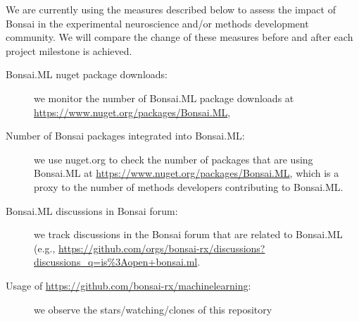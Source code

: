 We are currently using the measures described below to assess the impact of
Bonsai in the experimental neuroscience and/or methods development community.
We will compare the change of these measures before and after each project
milestone is achieved.

\begin{description}

    \item[Bonsai.ML nuget package downloads:] we monitor the number of
    Bonsai.ML package downloads at
    \url{https://www.nuget.org/packages/Bonsai.ML},

    \item[Number of Bonsai packages integrated into Bonsai.ML:] we use
    nuget.org to check the number of packages that are using Bonsai.ML at
    \url{https://www.nuget.org/packages/Bonsai.ML}, which is a proxy to the
    number of methods developers contributing to Bonsai.ML.

    \item[Bonsai.ML discussions in Bonsai forum:] we track discussions in the
    Bonsai forum that are related to Bonsai.ML (e.g.,
    \url{https://github.com/orgs/bonsai-rx/discussions?discussions_q=is%3Aopen+bonsai.ml}.

    \item[Usage of \url{https://github.com/bonsai-rx/machinelearning}:] we
    observe the stars/watching/clones of this repository

\end{description}
